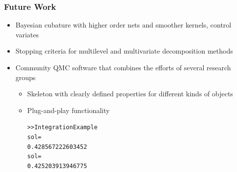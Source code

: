 \documentclass[10pt,compress,xcolor={usenames,dvipsnames},aspectratio=169]{beamer} %
\begin{document}
\begin{frame}[fragile]
\frametitle{Future Work}

\vspace{-3ex}
\begin{itemize}
	\item Bayesian cubature with higher order nets and smoother kernels, control variates
	
	\item Stopping criteria for multilevel and multivariate decomposition methods
	
	\item Community QMC software that \alert{combines the efforts of several research groups}
	\begin{itemize}
		\item Skeleton with clearly defined properties for different kinds of objects
		
		\item Plug-and-play functionality
		
		\vspace{-2ex}
		
	
		
		
		\begin{alltt}
			>> IntegrationExample
			sol =
			0.428567222603452
			sol =
			0.425203913946775
		\end{alltt}
		
	\end{itemize}
	
\end{itemize}
\end{frame}


\setlength{\FJHThankYouMessageOffset}{-10ex}


\thankyouframe

\printbibliography
\end{document}
